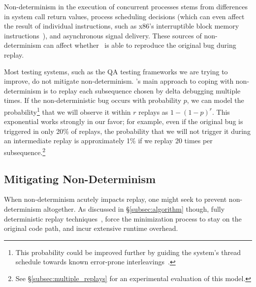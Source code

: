 Non-determinism in the execution of concurrent processes stems from
differences in system call return values, process scheduling decisions (which can
even affect the result of individual instructions, such as x86's
interruptible block memory instructions~\cite{Dunlap:2002:REI:844128.844148}),
and asynchronous signal
delivery. These sources of non-determinism can affect whether \projectname~is
able to reproduce the original bug during replay.

Most testing systems, such as the QA testing frameworks we are
trying to improve, do not mitigate non-determinism.
\projectname's main approach to coping with non-determinism
is to replay each subsequence chosen
by delta debugging multiple times. If the non-deterministic bug occurs with
probability $p$, we can model the probability\footnote{This probability could be improved further by guiding the system's thread schedule
towards known error-prone interleavings~\cite{park2009ctrigger,park2009pres}.}
that we will observe it within $r$ replays as $1-(1-p)^{r}$. This exponential
works strongly in our favor; for example, even if the original bug is
triggered in only 20\% of replays, the probability that we will not trigger
it during an intermediate replay is approximately
1\% if we replay 20 times per subsequence.\footnote{See
\S\ref{subsec:multiple_replays} for an experimental evaluation of this model.}

\subsection{Mitigating Non-Determinism}
\label{subsec:mitigating}

When non-determinism acutely impacts replay, one might seek to prevent non-determinism altogether.
As discussed in \S\ref{subsec:algorithm} though, fully deterministic replay techniques~\cite{Dunlap:2002:REI:844128.844148,Geels:2006:RDD:1267359.1267386},
force the minimization process to stay on the original code path, and incur
extensive runtime overhead.

